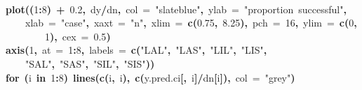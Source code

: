 \documentclass{article}
\makeatletter
\newcommand{\hlnumber}[1]{\textcolor[rgb]{0,0,0}{#1}}%
\newcommand{\hlfunctioncall}[1]{\textcolor[rgb]{.5,0,.33}{\textbf{#1}}}%
\newcommand{\hlstring}[1]{\textcolor[rgb]{.6,.6,1}{#1}}%
\newcommand{\hlkeyword}[1]{\textbf{#1}}%
\newcommand{\hlargument}[1]{\textcolor[rgb]{.69,.25,.02}{#1}}%
\newcommand{\hlsymbol}[1]{#1}%
\newcommand{\hlstd}[1]{\textcolor[rgb]{0,0,0}{#1}}%
\newenvironment{kframe}{%
 \def\FrameCommand##1{\hskip\@totalleftmargin \hskip-\fboxsep
 \colorbox{shadecolor}{##1}\hskip-\fboxsep
     \hskip-\linewidth \hskip-\@totalleftmargin \hskip\columnwidth}%
 \MakeFramed {\advance\hsize-\width
   \@totalleftmargin\z@ \linewidth\hsize
   \@setminipage}}%
 {\par\unskip\endMakeFramed}
\newenvironment{knitrout}{}{} %
\makeatother
\begin{document}
\begin{knitrout}
{\begin{kframe}
\begin{flushleft}
\ttfamily\noindent
\hspace*{\fill}\\
\hlstd{}\hlfunctioncall{plot}\hlkeyword{(}\hlkeyword{(}\hlnumber{1}\hlkeyword{:}\hlnumber{8}\hlkeyword{)}{\ }\hlkeyword{+}{\ }\hlnumber{0.2}\hlkeyword{,}{\ }\hlsymbol{d}\hlkeyword{\usebox{\hlnormalsizeboxdollar}}\hlsymbol{y}\hlkeyword{/}\hlsymbol{d}\hlkeyword{\usebox{\hlnormalsizeboxdollar}}\hlsymbol{n}\hlkeyword{,}{\ }\hlargument{col}{\ }\hlargument{=}{\ }\hlstring{"slateblue"}\hlkeyword{,}{\ }\hlargument{ylab}{\ }\hlargument{=}{\ }\hlstring{"proportion{\ }successful"}\hlkeyword{,}\hspace*{\fill}\\
\hlstd{}{\ }{\ }{\ }{\ }\hlargument{xlab}{\ }\hlargument{=}{\ }\hlstring{"case"}\hlkeyword{,}{\ }\hlargument{xaxt}{\ }\hlargument{=}{\ }\hlstring{"n"}\hlkeyword{,}{\ }\hlargument{xlim}{\ }\hlargument{=}{\ }\hlfunctioncall{c}\hlkeyword{(}\hlnumber{0.75}\hlkeyword{,}{\ }\hlnumber{8.25}\hlkeyword{)}\hlkeyword{,}{\ }\hlargument{pch}{\ }\hlargument{=}{\ }\hlnumber{16}\hlkeyword{,}{\ }\hlargument{ylim}{\ }\hlargument{=}{\ }\hlfunctioncall{c}\hlkeyword{(}\hlnumber{0}\hlkeyword{,}\hspace*{\fill}\\
\hlstd{}{\ }{\ }{\ }{\ }{\ }{\ }{\ }{\ }\hlnumber{1}\hlkeyword{)}\hlkeyword{,}{\ }\hlargument{cex}{\ }\hlargument{=}{\ }\hlnumber{0.5}\hlkeyword{)}\hspace*{\fill}\\
\hlstd{}\hlfunctioncall{axis}\hlkeyword{(}\hlnumber{1}\hlkeyword{,}{\ }\hlargument{at}{\ }\hlargument{=}{\ }\hlnumber{1}\hlkeyword{:}\hlnumber{8}\hlkeyword{,}{\ }\hlargument{labels}{\ }\hlargument{=}{\ }\hlfunctioncall{c}\hlkeyword{(}\hlstring{"LAL"}\hlkeyword{,}{\ }\hlstring{"LAS"}\hlkeyword{,}{\ }\hlstring{"LIL"}\hlkeyword{,}{\ }\hlstring{"LIS"}\hlkeyword{,}\hspace*{\fill}\\
\hlstd{}{\ }{\ }{\ }{\ }\hlstring{"SAL"}\hlkeyword{,}{\ }\hlstring{"SAS"}\hlkeyword{,}{\ }\hlstring{"SIL"}\hlkeyword{,}{\ }\hlstring{"SIS"}\hlkeyword{)}\hlkeyword{)}\hspace*{\fill}\\
\hlstd{}\hlkeyword{for}{\ }\hlkeyword{(}\hlsymbol{i}{\ }\hlkeyword{in}{\ }\hlnumber{1}\hlkeyword{:}\hlnumber{8}\hlkeyword{)}{\ }\hlfunctioncall{lines}\hlkeyword{(}\hlfunctioncall{c}\hlkeyword{(}\hlsymbol{i}\hlkeyword{,}{\ }\hlsymbol{i}\hlkeyword{)}\hlkeyword{,}{\ }\hlfunctioncall{c}\hlkeyword{(}\hlsymbol{y.pred.ci}\hlkeyword{[}\hlkeyword{,}{\ }\hlsymbol{i}\hlkeyword{]}\hlkeyword{/}\hlsymbol{d}\hlkeyword{\usebox{\hlnormalsizeboxdollar}}\hlsymbol{n}\hlkeyword{[}\hlsymbol{i}\hlkeyword{]}\hlkeyword{)}\hlkeyword{,}{\ }\hlargument{col}{\ }\hlargument{=}{\ }\hlstring{"grey"}\hlkeyword{)}\hspace*{\fill}\\

\end{flushleft}
\end{kframe}}
\end{knitrout}
\end{document}
